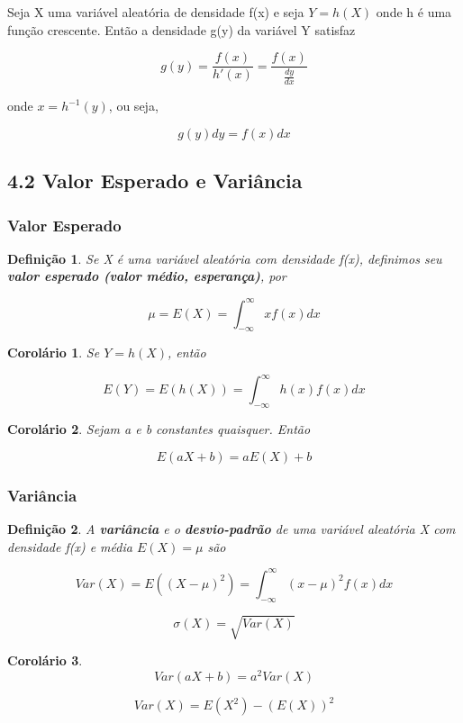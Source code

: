 \documentclass[12pt]{article}
\newtheorem{corollary}{Corolário}[theorem]
\newtheorem{definition}{Definição}
\begin{document}
Seja X uma variável aleatória de densidade f(x) e seja $Y = h(X)$ onde h é uma função crescente. Então a densidade g(y) da variável Y satisfaz

$$g(y) = \dfrac{f(x)}{h'(x)} = \dfrac{f(x)}{\frac{d y}{d x}}$$

onde $x = h^{-1} (y)$, ou seja,

$$g(y) d y = f(x) d x$$

\subsection*{4.2 Valor Esperado e Variância}
\subsubsection*{Valor Esperado}

\begin{definition}
    Se X é uma variável aleatória com densidade f(x), definimos seu \textbf{valor esperado (valor médio, esperança)}, por
    
    $$\mu = E(X) = \int_{- \infty}^{\infty} x f(x) d x$$
\end{definition}

\begin{corollary}
    Se $Y = h(X)$, então 
    
    $$E(Y) = E(h(X)) = \int_{- \infty}^{\infty} h(x) f(x) d x$$
\end{corollary}

\begin{corollary}
    Sejam a e b constantes quaisquer. Então
    
    $$E(a X + b) = a E(X) + b$$
\end{corollary}

\subsubsection*{Variância}

\begin{definition}
    A \textbf{variância} e o \textbf{desvio-padrão} de uma variável aleatória X com densidade f(x) e média $E(X) = \mu$ são
    
    $$Var(X) = E \left ((X - \mu)^2 \right ) = \int_{- \infty}^{\infty} (x - \mu)^2 f(x) d x$$
    
    $$\sigma(X) = \sqrt{Var (X)}$$
\end{definition}

\begin{corollary}
    $$Var(a X + b) = a^2 Var(X)$$
    
    $$Var(X) = E(X^2) - (E(X))^2$$
\end{corollary}
\end{document}
